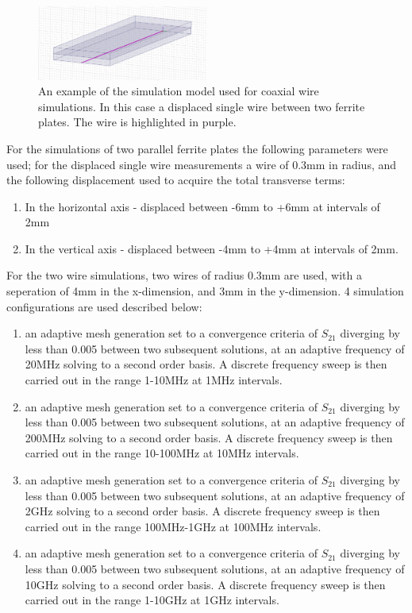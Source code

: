 \documentclass[review, number, sort&compress]{elsarticle}
\begin{document}
\begin{figure}
\begin{center}
\includegraphics[width=0.5\textwidth]{figures/cross-section-coaxial-wire-measurements.png}
\end{center}
\caption{An example of the simulation model used for coaxial wire simulations. In this case a displaced single wire between two ferrite plates. The wire is highlighted in purple.}
\label{fig:wire-sim-model}
\end{figure}


For the simulations of two parallel ferrite plates the following parameters were used; for the displaced single wire measurements a wire of 0.3mm in radius, and the following displacement used to acquire the total transverse terms:

\begin{enumerate}
\item{In the horizontal axis -  displaced between -6mm to +6mm at intervals of 2mm}
\item{In the vertical axis - displaced between -4mm to +4mm at intervals of 2mm.}
\end{enumerate}

For the two wire simulations, two wires of radius 0.3mm are used, with a seperation of 4mm in the x-dimension, and 3mm in the y-dimension. 4 simulation configurations are used described below:

\begin{enumerate}
\item{an adaptive mesh generation set to a convergence criteria of $S_{21}$ diverging by less than 0.005 between two subsequent solutions, at an adaptive frequency of 20MHz solving to a second order basis. A discrete frequency sweep is then carried out in the range 1-10MHz at 1MHz intervals.}
\item{an adaptive mesh generation set to a convergence criteria of $S_{21}$ diverging by less than 0.005 between two subsequent solutions, at an adaptive frequency of 200MHz solving to a second order basis. A discrete frequency sweep is then carried out in the range 10-100MHz at 10MHz intervals.}
\item{an adaptive mesh generation set to a convergence criteria of $S_{21}$ diverging by less than 0.005 between two subsequent solutions, at an adaptive frequency of 2GHz solving to a second order basis. A discrete frequency sweep is then carried out in the range 100MHz-1GHz at 100MHz intervals.}
\item{an adaptive mesh generation set to a convergence criteria of $S_{21}$ diverging by less than 0.005 between two subsequent solutions, at an adaptive frequency of 10GHz solving to a second order basis. A discrete frequency sweep is then carried out in the range 1-10GHz at 1GHz intervals.}
\end{enumerate}
\end{document}
